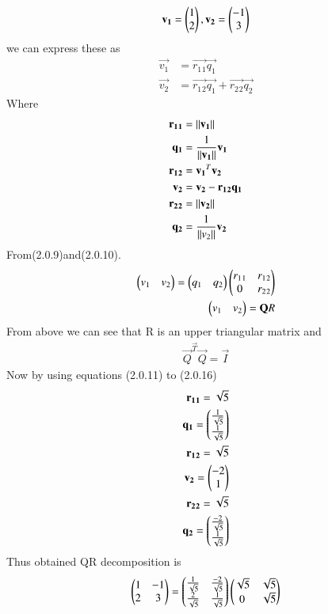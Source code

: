 \documentclass[journal,12pt,twocolumn]{IEEEtran}
\begin{document}
\begin{enumerate}
\begin{align}
\mathbf{v_1}=\begin{pmatrix}1 \\ 2\end{pmatrix},
\mathbf{v_2}=\begin{pmatrix}-1 \\ 3\end{pmatrix}
\end{align}
we can express these as 
\begin{align}
\vec{v_1}&=\vec{r_1{}_1}{\vec{q_1}}
\\
\vec{v_2}&=\vec{r_1{}_2}{\vec{q_1}}+\vec{r_2{}_2}{\vec{q_2}}
\end{align}
Where
\begin{align}
\mathbf{r_1{}_1}&=\left\lVert\mathbf{v_1}\right\rVert
\\
\mathbf{q_1}&=\frac{1}{\left\lVert\mathbf{v_1}\right\rVert}{\mathbf{v_1}}
\\
\mathbf{r_1{}_2}&=\mathbf{v_1}^{T}{\mathbf{v_2}}
\\
\mathbf{v_2}&=\mathbf{v_2}-\mathbf{r_1{}_2}\mathbf{q_1}
\\
\mathbf{r_2{}_2}&=\left\lVert\mathbf{v_2}\right\rVert
\\
\mathbf{q_2}&=\frac{1}{\left\lVert v_2\right\rVert}\mathbf{v_2}
\end{align}
From(2.0.9)and(2.0.10).
\begin{align}
\begin{pmatrix}v_1 & v_2\end{pmatrix}=\begin{pmatrix}q_1 & q_2\end{pmatrix}\begin{pmatrix}r_1{}_1 & r_1{}_2 \\ 0 & r_2{}_2\end{pmatrix}
\\
\begin{pmatrix}v_1 & v_2\end{pmatrix}=\mathbf{Q}{R}
\end{align}
From above we can see that R is an upper triangular matrix and 
\begin{align}
\vec{Q}^{\vec{T}}{\vec{Q}}=\Vec{I}
\end{align}
Now by using equations (2.0.11) to (2.0.16)
\begin{align}
\vec{r_1{}_1}=\sqrt{5}
\\
\Vec{q_1}=\myvec{\frac{1}{\sqrt{5}} \\ \frac{1}{\sqrt{5}}}
\\
\Vec{r_1{}_2}=\sqrt{5}
\\
\Vec{v_2}=\myvec{-2 \\ 1} 
\\
\Vec{r_2{}_2}=\sqrt{5}
\\
\Vec{q_2}=\myvec{\frac{-2}{\sqrt{5}} \\ \frac{1}{\sqrt{5}} }
\end{align}
Thus obtained QR decomposition is 
\begin{align}
\begin{pmatrix}1 & -1 \\ 2 & 3\end{pmatrix}=\begin{pmatrix}\frac{1}{\sqrt{5}} & \frac{-2}{\sqrt{5}} \\ \frac{2}{\sqrt{5}} & \frac{1}{\sqrt{5}}\end{pmatrix}\begin{pmatrix}\sqrt{5} & \sqrt{5} \\ 0 & \sqrt{5}\end{pmatrix}
\end{align}
\end{enumerate}
\end{document}
